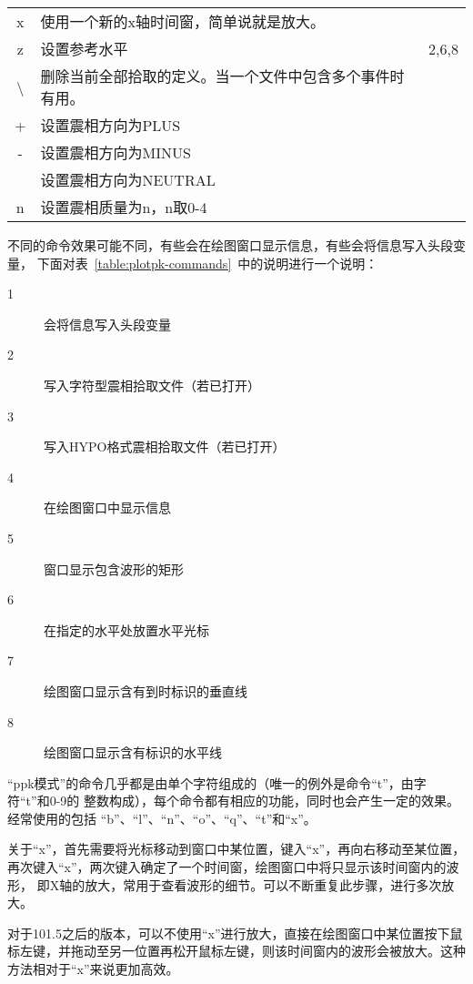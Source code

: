\begin{table}[H]
\begin{tabular}{cll}
    x	    &	使用一个新的x轴时间窗，简单说就是放大。 &           \\
    z	    &	设置参考水平                            &   2,6,8	\\
    \textbackslash	    &	删除当前全部拾取的定义。当一个文件中包含多个事件时有用。&	\\
    +	    &	设置震相方向为PLUS	                    &           \\
    -	    &	设置震相方向为MINUS	                    &           \\
    \lstinline[showspaces]{ }   &	设置震相方向为NEUTRAL	                &           \\
    n	    &	设置震相质量为n，n取0-4	                &           \\
	\bottomrule
\end{tabular}
\end{table}

不同的命令效果可能不同，有些会在绘图窗口显示信息，有些会将信息写入头段变量，
下面对表~\ref{table:plotpk-commands}~中的说明进行一个说明：
\begin{description}
    \item [1] 会将信息写入头段变量
    \item [2] 写入字符型震相拾取文件（若已打开）
    \item [3] 写入HYPO格式震相拾取文件（若已打开）
    \item [4] 在绘图窗口中显示信息
    \item [5] 窗口显示包含波形的矩形
    \item [6] 在指定的水平处放置水平光标
    \item [7] 绘图窗口显示含有到时标识的垂直线
    \item [8] 绘图窗口显示含有标识的水平线
\end{description}

``ppk模式''的命令几乎都是由单个字符组成的（唯一的例外是命令``t''，由字符``t''和0-9的
整数构成），每个命令都有相应的功能，同时也会产生一定的效果。经常使用的包括
``b''、``l''、``n''、``o''、``q''、``t''和``x''。

关于``x''，首先需要将光标移动到窗口中某位置，键入``x''，再向右移动至某位置，
再次键入``x''，两次键入确定了一个时间窗，绘图窗口中将只显示该时间窗内的波形，
即X轴的放大，常用于查看波形的细节。可以不断重复此步骤，进行多次放大。

对于101.5之后的版本，可以不使用``x''进行放大，直接在绘图窗口中某位置按下鼠标左键，并拖动至另一位置再松开鼠标左键，则该时间窗内的波形会被放大。这种方法相对于``x''来说更加高效。

